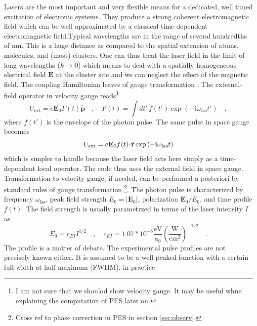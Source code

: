 \documentclass[final,1p]{elsarticle}
\newcommand{\PGRfoot}[1]{{\color{blue}\footnote{\color{blue} #1}}}
\begin{document}
Lasers are the most important and very flexible means for a dedicated,
well tuned excitation of electronic systems.  They produce a strong
coherent electromagnetic field which can be well approximated by a
classical time-dependent electromagnetic field.Typical wavelengths are
in the range of several hundredths of nm. This is a huge distance as
compared to the spatial extension of atoms, molecules, and (most)
clusters.  One can thus treat the laser field in the limit of long
wavelengths ($k \rightarrow 0$) which means to deal with a spatially
homogeneous electrical field $\mathbf{E}$ at the cluster site and we
can neglect the effect of the magnetic field.  The coupling
Hamiltonian leaves of gauge transformation \cite{Jac62}.
The external-field operator in velocity gauge reads\PGRfoot{I am not
  sure that we shoulod show velocity gauge. It may be useful whne
  explaining the computation of PES later on.}
\begin{equation}
  U_\mathrm{ext}
  =
  e\mathcal{\mathbf{E}}_0F(t)\hat{\mathbf{p}}
  \quad,\quad
  F(t)
  =
  \int dt'\,f(t')\exp{(-\mathrm{i}\omega_\mathrm{las}t')}
  \quad,
\label{eq:laserp}
\end{equation}
where $f(t')$ is the envelope of the photon pulse.
The same pulse in space gauge becomes
\begin{equation}
  U_\mathrm{ext}
  =
  e{\cal\bf E}_0f(t)\!\cdot\!\hat{\mathbf{r}}
  \exp{(-\mathrm{i}\omega_\mathrm{las}t)}
\label{eq:laserr}
\end{equation}
which is simpler to handle because the laser field acts here simply as
a time-dependent local operator. The code thus uses the external field
in space gauge. Transformation to velocity gauge, if needed, can
be performed a posteriori by standard rules of gauge transformation
\cite{Mes95aB}\PGRfoot{Cross ref to phase correction in PES in section
\ref{sec:observ}.}.
%
The photon pulse is characterized by frequency
$\omega_\mathrm{las}$, peak field strength $E_0=|\mathbf{E}_0|$,
polarization $\mathbf{E}_0/E_0$, and time profile $f(t)$. The
field strength is usually parametrzed in terms of the laser intensity
$I$ as
\begin{equation}
  E_0
  =
  c_{EI}
  I^{1/2}
  \quad,\quad
  c_{EI}
  =
  1.07*10^{-8}
  \frac{\mathrm{eV}}{\mathrm{a}_0}
  \left(\frac{\mathrm{W}}{\mathrm{cm}^2}\right)^{-1/2}
  \quad.
\end{equation}
The profile is a matter of debate.  The experimental pulse profiles
are not precisely known either.  It is assumed to be a well peaked
function with a certain full-width at half maximum (FWHM), in practice
\end{document}
